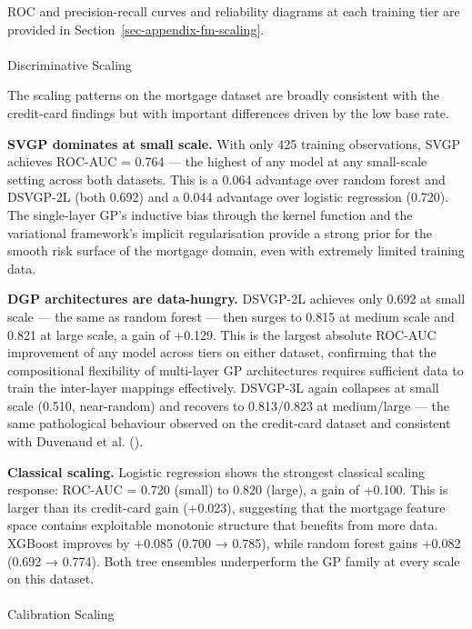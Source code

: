 \documentclass[
  letterpaper,
  DIV=11,
  numbers=noendperiod]{scrartcl}
\makeatletter
\let\oldparagraph\paragraph
\renewcommand{\paragraph}{
    \@ifstar
      \xxxParagraphStar
      \xxxParagraphNoStar
  }
\newcommand{\xxxParagraphStar}[1]{\oldparagraph*{#1}\mbox{}}
\newcommand{\xxxParagraphNoStar}[1]{\oldparagraph{#1}\mbox{}}
\makeatother
\begin{document}
ROC and precision-recall curves and reliability diagrams at each
training tier are provided in Section~\ref{sec-appendix-fm-scaling}.

\paragraph{Discriminative Scaling}\label{discriminative-scaling-1}

The scaling patterns on the mortgage dataset are broadly consistent with
the credit-card findings but with important differences driven by the
low base rate.

\textbf{SVGP dominates at small scale.} With only 425 training
observations, SVGP achieves ROC-AUC = 0.764 --- the highest of any model
at any small-scale setting across both datasets. This is a 0.064
advantage over random forest and DSVGP-2L (both 0.692) and a 0.044
advantage over logistic regression (0.720). The single-layer GP's
inductive bias through the kernel function and the variational
framework's implicit regularisation provide a strong prior for the
smooth risk surface of the mortgage domain, even with extremely limited
training data.

\textbf{DGP architectures are data-hungry.} DSVGP-2L achieves only 0.692
at small scale --- the same as random forest --- then surges to 0.815 at
medium scale and 0.821 at large scale, a gain of +0.129. This is the
largest absolute ROC-AUC improvement of any model across tiers on either
dataset, confirming that the compositional flexibility of multi-layer GP
architectures requires sufficient data to train the inter-layer mappings
effectively. DSVGP-3L again collapses at small scale (0.510,
near-random) and recovers to 0.813/0.823 at medium/large --- the same
pathological behaviour observed on the credit-card dataset and
consistent with Duvenaud et al.
().

\textbf{Classical scaling.} Logistic regression shows the strongest
classical scaling response: ROC-AUC = 0.720 (small) to 0.820 (large), a
gain of +0.100. This is larger than its credit-card gain (+0.023),
suggesting that the mortgage feature space contains exploitable
monotonic structure that benefits from more data. XGBoost improves by
+0.085 (0.700 → 0.785), while random forest gains +0.082 (0.692 →
0.774). Both tree ensembles underperform the GP family at every scale on
this dataset.

\paragraph{Calibration Scaling}\label{calibration-scaling-1}
\end{document}
